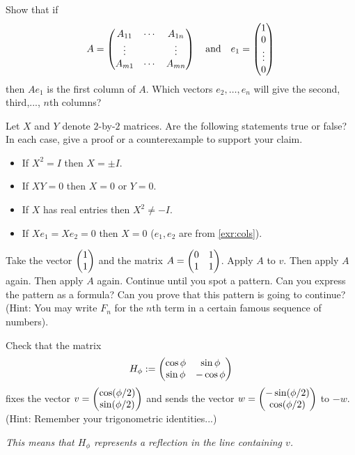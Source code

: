 \documentclass{article}
\begin{document}
\begin{Exercise}\label{exr:cols}
Show that if \[A=\begin{pmatrix} A_{11} & \cdots & A_{1n} \\ \vdots & & \vdots
\\ A_{m1} &\cdots & A_{mn}\end{pmatrix}\quad\mbox{and}\quad e_1=\begin{pmatrix} 1 \\ 0
\\ \vdots \\ 0\end{pmatrix}\] then \(Ae_1\) is the first column of
\(A\). Which vectors \(e_2,\ldots,e_n\) will give the second,
third,..., \(n\)th columns?


\end{Exercise}
\begin{Exercise}\label{exr:truefalse}
Let \(X\) and \(Y\) denote \(2\)-by-\(2\) matrices. Are the
following statements true or false? In each case, give a proof or a
counterexample to support your claim.
\begin{itemize}
\item If \(X^2=I\) then \(X=\pm I\).
\item If \(XY=0\) then \(X=0\) or \(Y=0\).
\item If \(X\) has real entries then \(X^2\neq -I\).
\item If \(Xe_1=Xe_2=0\) then \(X=0\) (\(e_1,e_2\) are from
\cref{exr:cols}).


\end{itemize}
\end{Exercise}
\begin{Exercise}\label{exr:fib}
Take the vector \(\begin{pmatrix} 1 \\ 1 \end{pmatrix}\) and the matrix \(A=\begin{pmatrix} 0 & 1 \\ 1
& 1 \end{pmatrix}\). Apply \(A\) to \(v\). Then apply \(A\) again. Then apply
\(A\) again. Continue until you spot a pattern. Can you express the
pattern as a formula? Can you prove that this pattern is going to
continue? (Hint: You may write \(F_n\) for the \(n\)th term in a
certain famous sequence of numbers).


\end{Exercise}
\begin{Exercise}\label{exr:ref}
Check that the matrix \[H_\phi:=\begin{pmatrix} \cos\phi & \sin\phi \\ \sin\phi
& -\cos\phi\end{pmatrix}\] fixes the vector \(v=\begin{pmatrix} \cos(\phi/2)
\\ \sin(\phi/2)\end{pmatrix}\) and sends the vector \(w=\begin{pmatrix} -\sin(\phi/2)
\\ \cos(\phi/2)\end{pmatrix}\) to \(-w\). (Hint: Remember your trigonometric
identities...)


{\em This means that \(H_\phi\) represents a reflection in the line
containing \(v\).}


\end{Exercise}
\end{document}
